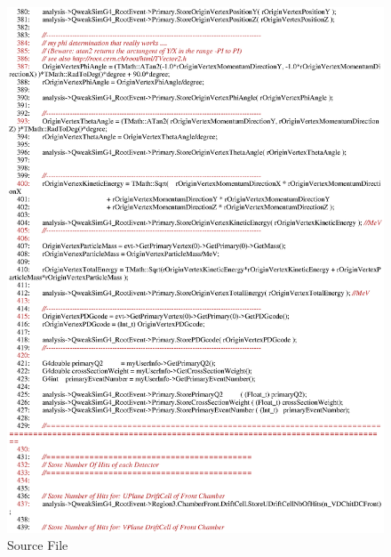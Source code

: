\begin{figure}[h]
  \hspace{0cm}
  \includegraphics[scale=0.8]{./figures13/QweakSimEventAction.cc-p7.eps}
  \caption{Source File}
           \label{fig:XIII-SC-22}
\end{figure}

\clearpage

